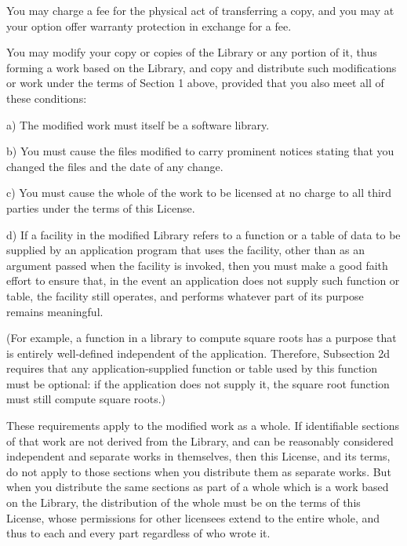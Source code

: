 You may charge a fee for the physical act of transferring a copy, and you may at your option offer warranty protection in exchange for a fee.
\begin{DoxyEnumerate}
\item You may modify your copy or copies of the Library or any portion of it, thus forming a work based on the Library, and copy and distribute such modifications or work under the terms of Section 1 above, provided that you also meet all of these conditions\-: \begin{DoxyVerb}a) The modified work must itself be a software library.

b) You must cause the files modified to carry prominent notices
stating that you changed the files and the date of any change.

c) You must cause the whole of the work to be licensed at no
charge to all third parties under the terms of this License.

d) If a facility in the modified Library refers to a function or a
table of data to be supplied by an application program that uses
the facility, other than as an argument passed when the facility
is invoked, then you must make a good faith effort to ensure that,
in the event an application does not supply such function or
table, the facility still operates, and performs whatever part of
its purpose remains meaningful.

(For example, a function in a library to compute square roots has
a purpose that is entirely well-defined independent of the
application.  Therefore, Subsection 2d requires that any
application-supplied function or table used by this function must
be optional: if the application does not supply it, the square
root function must still compute square roots.)
\end{DoxyVerb}

\end{DoxyEnumerate}

These requirements apply to the modified work as a whole. If identifiable sections of that work are not derived from the Library, and can be reasonably considered independent and separate works in themselves, then this License, and its terms, do not apply to those sections when you distribute them as separate works. But when you distribute the same sections as part of a whole which is a work based on the Library, the distribution of the whole must be on the terms of this License, whose permissions for other licensees extend to the entire whole, and thus to each and every part regardless of who wrote it.

